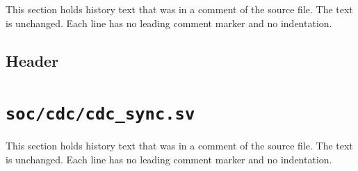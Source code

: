 This section holds history text that was in a comment of the source file. The text is unchanged. Each line has no leading comment marker and no indentation.

\begin{record}

\subsection*{Header}


\end{record}

\section{\texttt{soc/cdc/cdc\_sync.sv}}\label{cr:mod:cdc-sync}

This section holds history text that was in a comment of the source file. The text is unchanged. Each line has no leading comment marker and no indentation.

